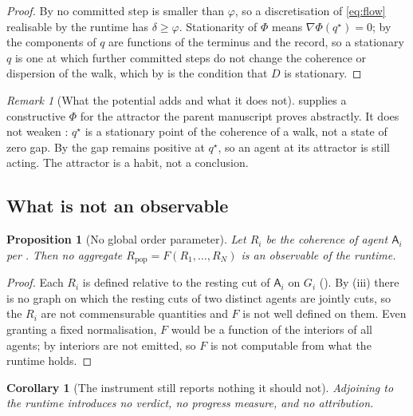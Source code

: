 \documentclass[11pt,a4paper]{article}
\theoremstyle{clstyle}
\newtheorem{proposition}[theorem]{Proposition}
\newtheorem{corollary}[theorem]{Corollary}
\theoremstyle{definition}
\theoremstyle{remark}
\newtheorem{remark}[theorem]{Remark}
\newcommand{\Ag}{\mathsf{A}}
\newcommand{\Ord}{R}
\newcommand{\gap}{D}                     %
\newcommand{\Pot}{\Phi}
\begin{document}
\begin{proof}
By  no committed step is smaller than $\varphi$, so a
discretisation of \eqref{eq:flow} realisable by the runtime has
$\delta\ge\varphi$. Stationarity of $\Pot$ means $\nabla\Pot(q^\star)=0$; by
 the components of $q$ are functions of the terminus and
the record, so a stationary $q$ is one at which further committed steps do
not change the coherence or dispersion of the walk, which by 
is the condition that $\gap$ is stationary.
\end{proof}

\begin{remark}[What the potential adds and what it does not]
\label{rem:potentialadds}
 supplies a constructive $\Pot$ for the attractor the
parent manuscript proves abstractly. It does not weaken
: $q^\star$ is a stationary point of the coherence of a
walk, not a state of zero gap. By  the gap remains
positive at $q^{\star}$, so an agent at its attractor is still acting. The
attractor is a habit, not a conclusion.
\end{remark}

\subsection{What is not an observable}
\label{sec:notobservable}

\begin{proposition}[No global order parameter]
\label{prop:noglobal}
Let $\Ord_i$ be the coherence of agent $\Ag_i$ per . Then
no aggregate $\Ord_{\mathrm{pop}}=F(\Ord_1,\dots,\Ord_N)$ is an observable of
the runtime.
\end{proposition}

\begin{proof}
Each $\Ord_i$ is defined relative to the resting cut of $\Ag_i$ on $G_i$
(). By (iii) there is no graph on which
the resting cuts of two distinct agents are jointly cuts, so the $\Ord_i$
are not commensurable quantities and $F$ is not well defined on them. Even
granting a fixed normalisation, $F$ would be a function of the interiors of
all agents; by  interiors are not emitted, so $F$ is not
computable from what the runtime holds.
\end{proof}

\begin{corollary}[The instrument still reports nothing it should not]
\label{cor:stillnothing}
Adjoining  to the runtime introduces no verdict, no
progress measure, and no attribution.
\end{corollary}
\end{document}
